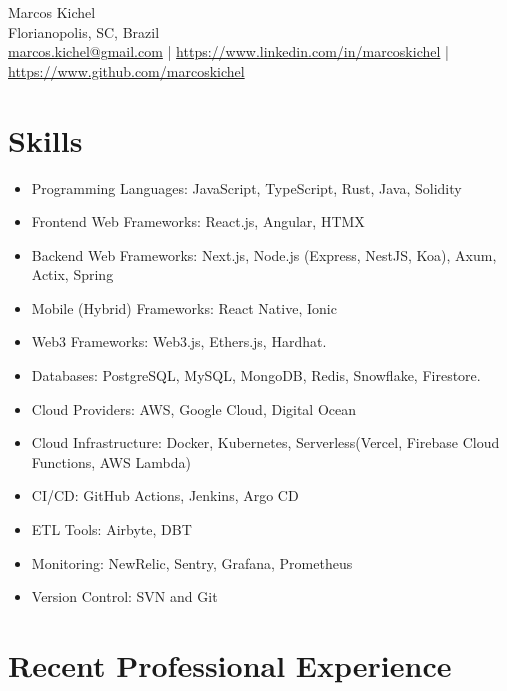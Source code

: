 \documentclass[11pt, a4paper]{article}
\begin{document}
\begin{center}
    {\Huge Marcos Kichel}\\
    \vspace{0.2cm}
    Florianopolis, SC, Brazil\\
    \href{mailto:marcos.kichel@gmail.com}{marcos.kichel@gmail.com} | \href{https://www.linkedin.com/in/marcoskichel/}{https://www.linkedin.com/in/marcoskichel} | \href{https://www.github.com/marcoskichel}{https://www.github.com/marcoskichel}
\end{center}

\section*{Skills}
\begin{itemize}[noitemsep]
    \item Programming Languages: JavaScript, TypeScript, Rust, Java, Solidity
    \item Frontend Web Frameworks: React.js, Angular, HTMX
    \item Backend Web Frameworks: Next.js, Node.js (Express, NestJS, Koa), Axum, Actix, Spring
    \item Mobile (Hybrid) Frameworks: React Native, Ionic
    \item Web3 Frameworks: Web3.js, Ethers.js, Hardhat.
    \item Databases: PostgreSQL, MySQL, MongoDB, Redis, Snowflake, Firestore.
    \item Cloud Providers: AWS, Google Cloud, Digital Ocean
    \item Cloud Infrastructure: Docker, Kubernetes, Serverless(Vercel, Firebase Cloud Functions, AWS Lambda)
    \item CI/CD: GitHub Actions, Jenkins, Argo CD
    \item ETL Tools: Airbyte, DBT
    \item Monitoring: NewRelic, Sentry, Grafana, Prometheus
    \item Version Control: SVN and Git
\end{itemize}

\section*{Recent Professional Experience}
\end{document}
